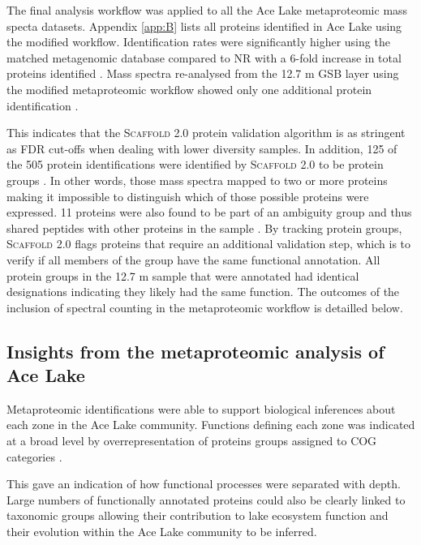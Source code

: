 The final analysis workflow was applied to all the Ace Lake metaproteomic mass specta datasets.
Appendix \ref{app:B} lists all proteins identified in Ace Lake using the modified workflow. 
Identification rates were significantly higher using the matched metagenomic database compared to \ac{NR} with a 6-fold increase in total proteins identified . 
Mass spectra re-analysed from the 12.7 m \ac{GSB} layer using the modified metaproteomic workflow showed only one additional protein identification .

This indicates that the \textsc{Scaffold} 2.0 protein validation algorithm is as stringent as \ac{FDR} cut-offs when dealing with lower diversity samples.
In addition, 125 of the 505 protein identifications were identified by \textsc{Scaffold} 2.0 to be protein groups .
In other words, those mass spectra mapped to two or more proteins making it impossible to distinguish which of those possible proteins were expressed.
11 proteins were also found to be part of an ambiguity group and thus shared peptides with other proteins in the sample .
By tracking protein groups, \textsc{Scaffold} 2.0 flags proteins that require an additional validation step, which is to verify if all members of the group have the same functional annotation.
All protein groups in the 12.7 m sample that were annotated had identical designations indicating they likely had the same function.
The outcomes of the inclusion of spectral counting in the metaproteomic workflow is detailled below.

\subsection[Insights from the metaproteomic analysis of Ace Lake]{Insights from the metaproteomic analysis of Ace Lake}

Metaproteomic identifications were able to support biological inferences about each zone in the Ace Lake community.
Functions defining each zone was indicated at a broad level by overrepresentation of proteins groups assigned to \ac{COG} categories . 

This gave an indication of how functional processes were separated with depth.
Large numbers of functionally annotated proteins could also be clearly linked to taxonomic groups allowing their contribution to lake ecosystem function and their evolution within the Ace Lake community to be inferred.

